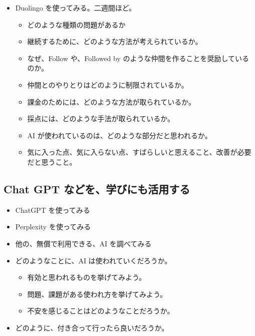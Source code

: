 \documentclass[
]{book}
\providecommand{\tightlist}{%
  \setlength{\itemsep}{0pt}\setlength{\parskip}{0pt}}
\theoremstyle{definition}
\theoremstyle{definition}
\theoremstyle{definition}
\theoremstyle{definition}
\theoremstyle{remark}
\begin{document}
\begin{itemize}
\tightlist
\item
  Duolingo を使ってみる。二週間ほど。

  \begin{itemize}
  \tightlist
  \item
    どのような種類の問題があるか
  \item
    継続するために、どのような方法が考えられているか。
  \item
    なぜ、Follow や、Followed by のような仲間を作ることを奨励しているのか。
  \item
    仲間とのやりとりはどのように制限されているか。
  \item
    課金のためには、どのような方法が取られているか。
  \item
    採点には、どのような手法が取られているか。
  \item
    AI が使われているのは、どのような部分だと思われるか。
  \item
    気に入った点、気に入らない点、すばらしいと思えること、改善が必要だと思うこと。
  \end{itemize}
\end{itemize}

\hypertarget{chat-gpt-ux306aux3069ux3092ux5b66ux3073ux306bux3082ux6d3bux7528ux3059ux308b}{%
\subsection{Chat GPT などを、学びにも活用する}\label{chat-gpt-ux306aux3069ux3092ux5b66ux3073ux306bux3082ux6d3bux7528ux3059ux308b}}

\begin{itemize}
\item
  ChatGPT を使ってみる
\item
  Perplexity を使ってみる
\item
  他の、無償で利用できる、AI を調べてみる
\item
  どのようなことに、AI は使われていくだろうか。

  \begin{itemize}
  \tightlist
  \item
    有効と思われるものを挙げてみよう。
  \item
    問題、課題がある使われ方を挙げてみよう。
  \item
    不安を感じることはどのようなことだろうか。
  \end{itemize}
\item
  どのように、付き合って行ったら良いだろうか。
\end{itemize}
\end{document}
